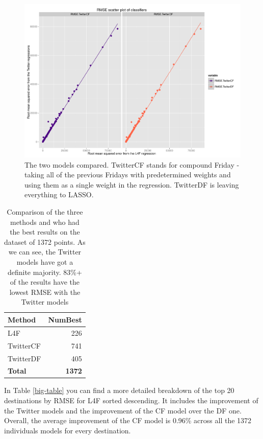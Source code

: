 \documentclass[minf,frontabs,twoside,singlespacing,parskip]{infthesis}
\begin{document}
\begin{figure}[h!]
\begin{center}
\includegraphics[scale=0.4]{rmse_scatter_by_reg}
\end{center}
\caption{The two models compared. TwitterCF stands for compound Friday - taking all of the previous Fridays with predetermined weights and using them as a single weight in the regression. TwitterDF is leaving everything to LASSO.}
\label{rmse_scatter_by_reg}
\end{figure}

\begin{table}[h!]
\begin{center}
\begin{tabular}{ l | r }
Method & NumBest \\
\hline
L4F & 226 \\
TwitterCF & 741 \\
TwitterDF & 405 \\
\hline
\textbf{Total} & \textbf{1372}
\end{tabular}
\end{center}
\caption{Comparison of the three methods and who had the best results on the dataset of 1372 points. As we can see, the Twitter models have got a definite majority. 83\%+ of the results have the lowest RMSE with the Twitter models}
\label{comparison-all}
\end{table}

In Table \ref{big-table} you can find a more detailed breakdown of the top 20 destinations by RMSE for L4F sorted descending. It includes the improvement of the Twitter models and the improvement of the CF model over the DF one. Overall, the average improvement of the CF model is 0.96\% across all the 1372 individuals models for every destination.
\end{document}
